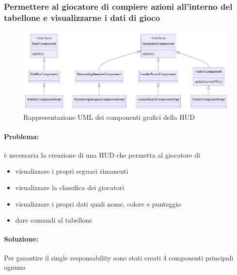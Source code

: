 \subsubsection*{Permettere al giocatore di compiere azioni all'interno del tabellone e visualizzarne i dati di gioco}
\begin{figure}[ht]
    \centering\includegraphics[]{images/HUD_uml.png}
    \caption{Rappresentazione UML dei componenti grafici della HUD}
\end{figure}
\paragraph{Problema:}
è necessaria la creazione di una HUD che permetta al giocatore di
\begin{itemize}
    \item visualizzare i propri seguaci rimanenti
    \item visualizzare la classifica dei giocatori
    \item visualizzare i propri dati quali nome, colore e punteggio
    \item dare comandi al tabellone
\end{itemize}
\paragraph{Soluzione:}
Per garantire il single responsability sono stati creati 4 componenti principali ognuno 
